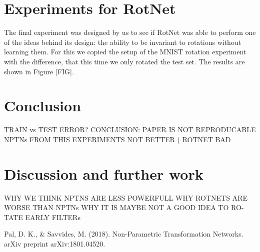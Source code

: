 \documentclass{llncs}
\begin{document}
\section{Experiments for RotNet}
The final experiment was designed by us to see if RotNet was able to perform one of the ideas behind its design: the ability to be invariant to rotations without learning them. For this we copied the setup of the MNIST rotation experiment with the difference, that this time we only rotated the test set. The results are shown in Figure [FIG]. 


\section{Conclusion}
TRAIN vs TEST ERROR?
CONCLUSION: PAPER IS NOT REPRODUCABLE NPTNs FROM THIS
EXPERIMENTS NOT BETTER ( ROTNET BAD
\section{Discussion and further work}
WHY WE THINK NPTNS ARE LESS POWERFULL WHY ROTNETS ARE
WORSE THAN NPTNs WHY IT IS MAYBE NOT A GOOD IDEA TO RO-
TATE EARLY FILTERs
%
%
\begin{thebibliography}{}
%
Pal, D. K., \& Savvides, M. (2018). Non-Parametric Transformation Networks. arXiv preprint arXiv:1801.04520.


\end{thebibliography}
%
\end{document}
